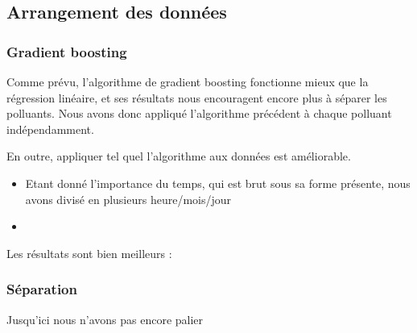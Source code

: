 \subsection{Arrangement des données}

\subsubsection{Gradient boosting}

Comme prévu, l'algorithme de gradient boosting fonctionne mieux que la régression linéaire, et ses résultats nous encouragent encore plus à séparer les polluants. Nous avons donc appliqué l'algorithme précédent à chaque polluant indépendamment. 

En outre, appliquer tel quel l'algorithme aux données est améliorable.
\begin{itemize}
	\item Etant donné l'importance du temps, qui est brut sous sa forme présente, nous avons divisé en plusieurs heure/mois/jour %
	\item %
\end{itemize}  

Les résultats sont bien meilleurs : 



\subsubsection{Séparation}

Jusqu'ici nous n'avons pas encore palier 